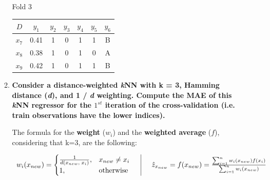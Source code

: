 \documentclass[12pt]{article}
\begin{document}
\begin{enumerate}[leftmargin=\labelsep]
\begin{enumerate}
\begin{table}[H]
                  \vskip 0.3cm
                  \begin{minipage}{.4\linewidth}
                    \centering
                    {\bfseries\strut Fold 3}
                    \begin{tabular}{c|cccccc}
                      \(D\)   & \(y_1\) & \(y_2\) & \(y_3\) & \(y_4\) & \(y_5\) & \(y_6\) \\
                      \hline
                      \(x_7\) & 0.41    & 1       & 0       & 1       & 1       & B       \\
                      \(x_8\) & 0.38    & 1       & 0       & 1       & 0       & A       \\
                      \(x_9\) & 0.42    & 1       & 0       & 1       & 1       & B       \\
                    \end{tabular}
                  \end{minipage}
                \end{table}

          \item \textbf{Consider a distance-weighted \textit{k}NN with k = 3, Hamming distance (\textit{d}), and 1 / \textit{d} weighting.
                  Compute the MAE of this \textit{k}NN regressor for the $1^{st}$ iteration of the cross-validation (i.e. train
                  observations have the lower indices).}

                \vskip 0.3cm

                The formula for the \textbf{weight} ($w_i$) and the \textbf{weighted average} ($f$), considering that k=3, are the following:

                \begin{equation}\label{exI2-a-WA}
                  \begin{array}{c|c}
                    \centering
                    w_i(x_{new})=
                    \begin{cases}
                      \frac{1}{d(x_{new},\; x_i)}, & x_{new} \neq x_i \\
                      1,                           & \text{otherwise}
                    \end{cases}
                    \quad &
                    \quad
                    \hat{z}_{x_{new}} = f(x_{new}) = \frac{\sum_{i=1}^{n} w_i(x_{new}) f(x_i)}{\sum_{i=1}^{n} w_i(x_{new})}
                  \end{array}
                \end{equation}


\end{enumerate}
\end{enumerate}
\end{document}
